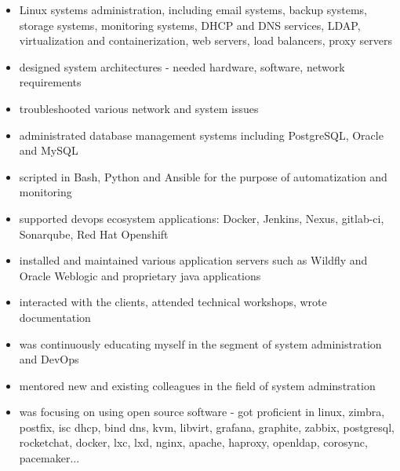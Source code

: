 \documentclass{cv}
\begin{document}
\begin{itemize}
    \setlength\itemsep{0.1cm}
    \item Linux systems administration, including email systems, backup systems, storage systems, monitoring systems, DHCP and DNS services, LDAP, virtualization and containerization, web servers, load balancers, proxy servers
    \item designed system architectures - needed hardware, software, network requirements
    \item troubleshooted various network and system issues 
    \item administrated database management systems including PostgreSQL, Oracle and MySQL
    \item scripted in Bash, Python and Ansible for the purpose of automatization and monitoring
    \item supported devops ecosystem applications: Docker, Jenkins, Nexus, gitlab-ci, Sonarqube, Red Hat Openshift
    \item installed and maintained various application servers such as Wildfly and Oracle Weblogic and proprietary java applications
    \item interacted with the clients, attended technical workshops, wrote documentation
    \item was continuously educating myself in the segment of system administration and DevOps
    \item mentored new and existing colleagues in the field of system adminstration
    \item was focusing on using open source software - got proficient in linux, zimbra, postfix, isc dhcp, bind dns, kvm, libvirt, grafana, graphite, zabbix, postgresql, rocketchat, docker, lxc, lxd, nginx, apache, haproxy, openldap, corosync, pacemaker...
\end{itemize}
\end{document}
